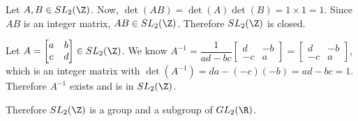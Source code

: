         Let $A,B \in SL_2(\Z)$.
        Now, $\det(AB) = \det(A)\det(B) = 1 \times 1 = 1$.
        Since $AB$ is an integer matrix, $AB \in SL_2(\Z)$.
        Therefore $SL_2(\Z)$ is closed.


        Let \(
            A = 
            \begin{bmatrix}
                a & b \\
                c & d
            \end{bmatrix}
            \in SL_2(\Z)
        \).
        We know \( 
            A^{-1} =
            \dfrac{1}{ad-bc}
            \begin{bmatrix}
                d & -b \\
                -c & a 
            \end{bmatrix}
            =
            \begin{bmatrix}
                d & -b \\
                -c & a 
            \end{bmatrix}
        \),
        which is an integer matrix with $\det(A^{-1}) = da - (-c)(-b) = ad - bc = 1$.
        Therefore $A^{-1}$ exists and is in $SL_2(\Z)$.

        Therefore $SL_2(\Z)$ is a group and a subgroup of $GL_2(\R)$.


